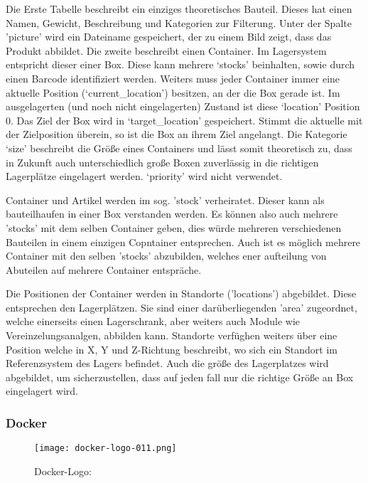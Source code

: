 Die Erste Tabelle beschreibt ein einziges theoretisches Bauteil. Dieses hat einen Namen, Gewicht, Beschreibung und Kategorien zur Filterung. Unter der Spalte 'picture' wird ein Dateiname gespeichert, der zu einem Bild zeigt, dass das Produkt abbildet.
Die zweite beschreibt einen Container. Im Lagersystem entspricht dieser einer Box. Diese kann mehrere `stocks' beinhalten, sowie durch einen Barcode identifiziert werden. Weiters muss jeder Container immer eine aktuelle Position (`current\_location') besitzen, an der die Box gerade ist. Im ausgelagerten (und noch nicht eingelagerten) Zustand ist diese `location' Position 0. Das Ziel der Box wird in `target\_location' gespeichert. Stimmt die aktuelle mit der Zielposition überein, so ist die Box an ihrem Ziel angelangt. Die Kategorie `size' beschreibt die Größe eines Containers und lässt somit theoretisch zu, dass in Zukunft auch unterschiedlich große Boxen zuverlässig in die richtigen Lagerplätze eingelagert werden. `priority' wird nicht verwendet.

Container und Artikel werden im sog. 'stock' verheiratet. Dieser kann als bauteilhaufen in einer Box verstanden werden. Es können also auch mehrere 'stocks' mit dem selben Container geben, dies würde mehreren verschiedenen Bauteilen in einem einzigen Copntainer entsprechen. Auch ist es möglich mehrere Container mit den selben 'stocks' abzubilden, welches ener aufteilung von Abuteilen auf mehrere Container entspräche.

Die Positionen der Container werden in Standorte ('locations') abgebildet. Diese entsprechen den Lagerplätzen. Sie sind einer darüberliegenden 'area' zugeordnet, welche einerseits einen Lagerschrank, aber weiters auch Module wie Vereinzelungsanalgen, abbilden kann. Standorte verfüghen weiters über eine Position welche in X, Y und Z-Richtung beschreibt, wo sich ein Standort im Referenzsystem des Lagers befindet. Auch die größe des Lagerplatzes wird abgebildet, um sicherzustellen, dass auf jeden fall nur die richtige Größe an Box eingelagert wird.


\subsubsection{Docker}

    \begin{wrapfigure}{r}{0.3\textwidth} %
        \vspace{-20px}
        \texttt{[image: docker-logo-011.png]} %
        \caption{Docker-Logo: \cite{docker_logo}}
    \end{wrapfigure}

